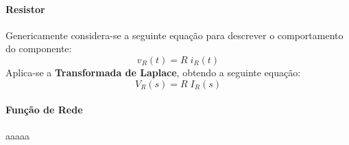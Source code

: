 \documentclass{article}
\begin{document}
\begin{multicols*}{2}
                    \paragraph{Resistor}Genericamente considera-se a seguinte equação para descrever o comportamento do componente:
                        \begin{equation*}
                            v_{R}(t) = R\;i_{R}(t)
                        \end{equation*}
                    Aplica-se a \textbf{Transformada de Laplace}, obtendo a seguinte equação:
                        \begin{equation}
                            \boxed{
                                V_{R}(s) = R\;I_{R}(s)
                            }
                        \end{equation}
                    \columnbreak
                    \paragraph{Função de Rede}aaaaa
                \end{multicols*}
\end{document}
